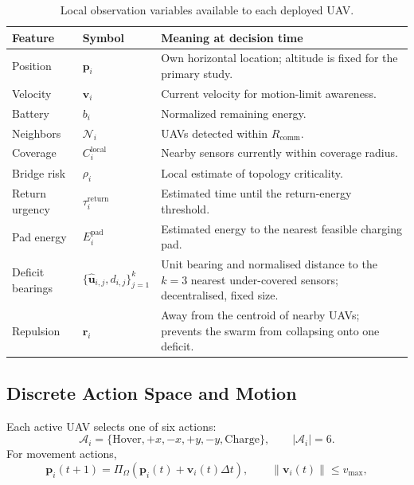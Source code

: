 \documentclass[conference]{IEEEtran}
\begin{document}
\begin{table}[t]
\caption{Local observation variables available to each deployed UAV.}
\label{tab:obs}
\centering
\scriptsize
\renewcommand{\arraystretch}{1.06}
\begin{tabularx}{\columnwidth}{@{}L{1.3cm}L{1.7cm}Y@{}}
\toprule
Feature & Symbol & Meaning at decision time \\
\midrule
Position & $\mathbf p_i$ & Own horizontal location; altitude is fixed for the primary study. \\
Velocity & $\mathbf v_i$ & Current velocity for motion-limit awareness. \\
Battery & $b_i$ & Normalized remaining energy. \\
Neighbors & $\mathcal N_i$ & UAVs detected within $R_{\mathrm{comm}}$. \\
Coverage & $C_i^{\mathrm{local}}$ & Nearby sensors currently within coverage radius. \\
Bridge risk & $\rho_i$ & Local estimate of topology criticality. \\
Return urgency & $\tau_i^{\mathrm{return}}$ & Estimated time until the return-energy threshold. \\
Pad energy & $E_i^{\mathrm{pad}}$ & Estimated energy to the nearest feasible charging pad. \\
Deficit bearings & $\{\hat{\mathbf u}_{i,j},d_{i,j}\}_{j=1}^{k}$ & Unit bearing and normalised distance to the $k=3$ nearest under-covered sensors; decentralised, fixed size. \\
Repulsion & $\mathbf r_i$ & Away from the centroid of nearby UAVs; prevents the swarm from collapsing onto one deficit. \\
\bottomrule
\end{tabularx}
\end{table}

\subsection{Discrete Action Space and Motion}
Each active UAV selects one of six actions:
\begin{equation}
\mathcal A_i=\{\mathrm{Hover},+x,-x,+y,-y,\mathrm{Charge}\},\qquad |\mathcal A_i|=6.
\label{eq:actions}
\end{equation}
For movement actions,
\begin{equation}
\mathbf p_i(t+1)=\Pi_{\Omega}\left(\mathbf p_i(t)+\mathbf v_i(t)\Delta t\right),
\qquad \|\mathbf v_i(t)\|\le v_{\max},
\label{eq:motion}
\end{equation}
\end{document}
